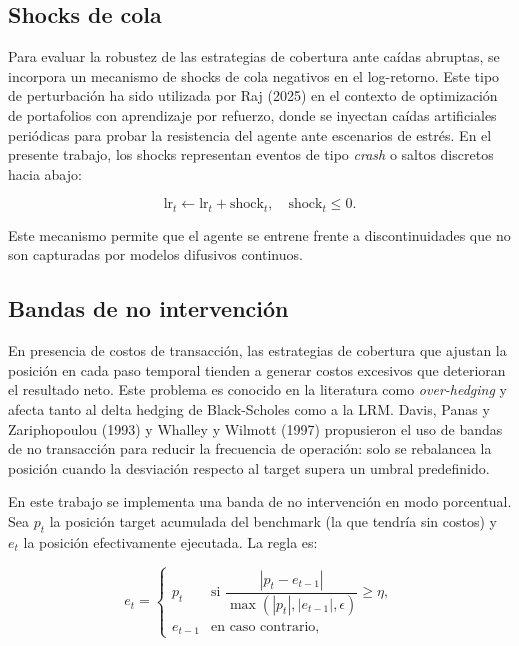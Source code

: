 \documentclass[11pt,a4paper,spanish]{article}
\numberwithin{equation}{section} %
\begin{document}
\subsection{Shocks de cola}\label{subsec:tail_shocks}

Para evaluar la robustez de las estrategias de cobertura ante caídas abruptas, se incorpora un mecanismo de shocks de cola negativos en el log-retorno. Este tipo de perturbación ha sido utilizada por Raj (2025) en el contexto de optimización de portafolios con aprendizaje por refuerzo, donde se inyectan caídas artificiales periódicas para probar la resistencia del agente ante escenarios de estrés. En el presente trabajo, los shocks representan eventos de tipo \textit{crash} o saltos discretos hacia abajo:

\begin{equation}
\text{lr}_t \leftarrow \text{lr}_t + \text{shock}_t, \quad \text{shock}_t \leq 0.
\end{equation}

 Este mecanismo permite que el agente se entrene frente a discontinuidades que no son capturadas por modelos difusivos continuos.

\subsection{Bandas de no intervención}\label{subsec:ni_bands}

En presencia de costos de transacción, las estrategias de cobertura que ajustan la posición en cada paso temporal tienden a generar costos excesivos que deterioran el resultado neto. Este problema es conocido en la literatura como \textit{over-hedging} y afecta tanto al delta hedging de Black-Scholes como a la LRM. Davis, Panas y Zariphopoulou (1993) y Whalley y Wilmott (1997) propusieron el uso de bandas de no transacción para reducir la frecuencia de operación: solo se rebalancea la posición cuando la desviación respecto al target supera un umbral predefinido.

En este trabajo se implementa una banda de no intervención en modo porcentual. Sea $p_t$ la posición target acumulada del benchmark (la que tendría sin costos) y $e_t$ la posición efectivamente ejecutada. La regla es:

\begin{equation}
e_t = \begin{cases}
p_t & \text{si } \dfrac{|p_t - e_{t-1}|}{\max(|p_t|, |e_{t-1}|, \epsilon)} \geq \eta, \\[6pt]
e_{t-1} & \text{en caso contrario,}
\end{cases}
\end{equation}
\end{document}
